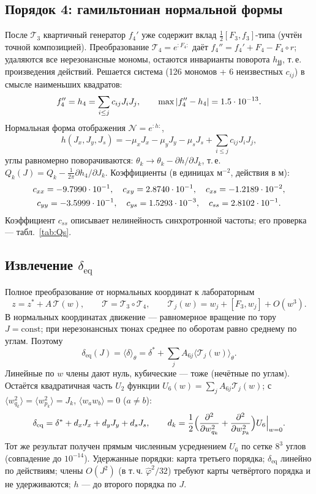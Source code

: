 \documentclass[a4paper,11pt]{article}
\newcommand{\deq}{\delta_{\mathrm{eq}}}
\begin{document}
\subsection{Порядок 4: гамильтониан нормальной формы}
После $\mathcal T_3$ квартичный генератор $f_4'$ уже содержит вклад $\tfrac12[F_3,f_3]$-типа (учтён точной композицией). Преобразование $\mathcal T_4=e^{:F_4:}$ даёт $f_4''=f_4'+F_4-F_4\circ r$; удаляются все нерезонансные мономы, остаются инварианты поворота $h_{\mathbf{jj}}$, т.\,е. произведения действий. Решается система (126 мономов + 6 неизвестных $c_{ij}$) в смысле наименьших квадратов:
\[
f_4''=h_4=\sum_{i\le j}c_{ij}J_iJ_j,\qquad \max|f_4''-h_4|=1.5\cdot10^{-13} .
\]
Нормальная форма отображения $\mathcal N=e^{:h:}$,
\[
h(J_x,J_y,J_s)=-\mu_xJ_x-\mu_yJ_y-\mu_sJ_s+\sum_{i\le j}c_{ij}J_iJ_j,
\]
углы равномерно поворачиваются: $\theta_k\to\theta_k-\partial h/\partial J_k$, т.\,е. $Q_k(J)=Q_k-\frac{1}{2\pi}\partial h_4/\partial J_k$. Коэффициенты (в единицах м$^{-2}$, действия в м):
\begin{gather*}
c_{xx}=-9.7990\cdot10^{-1},\quad c_{xy}=2.8740\cdot10^{-1},\quad c_{xs}=-1.2189\cdot10^{-2},\\
c_{yy}=-3.5999\cdot10^{-1},\quad c_{ys}=1.5293\cdot10^{-3},\quad c_{ss}=2.8102\cdot10^{-1} .
\end{gather*}
Коэффициент $c_{ss}$ описывает нелинейность синхротронной частоты; его проверка --- табл.~\ref{tab:Qs}.

\subsection{Извлечение $\deq$}\label{sec:nf-deq}
Полное преобразование от нормальных координат к лабораторным
\[
z=z^\ast+A\,\mathcal T(w),\qquad \mathcal T=\mathcal T_3\circ\mathcal T_4,\qquad \mathcal T_j(w)=w_j+[F_3,w_j]+O(w^3).
\]
В нормальных координатах движение --- равномерное вращение по тору $J=\mathrm{const}$; при нерезонансных тюнах среднее по оборотам равно среднему по углам. Поэтому
\[
\deq(J)=\langle\delta\rangle_\theta=\delta^\ast+\sum_jA_{6j}\bigl\langle\mathcal T_j(w)\bigr\rangle_\theta .
\]
Линейные по $w$ члены дают нуль, кубические --- тоже (нечётные по углам). Остаётся квадратичная часть $U_2$ функции $U_6(w)=\sum_jA_{6j}\mathcal T_j(w)$; с $\langle w_{q_k}^2\rangle=\langle w_{p_k}^2\rangle=J_k$, $\langle w_aw_b\rangle=0$ ($a\ne b$):
\[
\deq=\delta^\ast+d_xJ_x+d_yJ_y+d_sJ_s,\qquad d_k=\frac12\Bigl(\frac{\partial^2}{\partial w_{q_k}^2}+\frac{\partial^2}{\partial w_{p_k}^2}\Bigr)U_6\Big|_{w=0}.
\]
Тот же результат получен прямым численным усреднением $U_6$ по сетке $8^3$ углов (совпадение до $10^{-14}$). Удержанные порядки: карта третьего порядка; $\deq$ линейно по действиям; члены $O(J^2)$ (в т.\,ч. $\hat\varphi^2/32$) требуют карты четвёртого порядка и не удерживаются; $h$ --- до второго порядка по $J$.
\end{document}
